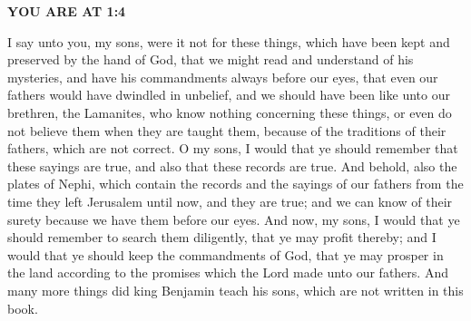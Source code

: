
\textbf{YOU ARE AT 1:4}

\bchapter

\bverse \iffalse I say unto you, my sons, were it not for these things, which have been kept and preserved by the hand of God, that we might read and understand of his mysteries, and have his commandments always before our eyes, that even our fathers would have dwindled in unbelief, and we should have been like unto our brethren, the Lamanites, who know nothing concerning these things, or even do not believe them when they are taught them, because of the traditions of their fathers, which are not correct. \fi
I say unto you, my sons, were it not for these things, which have been kept and preserved by the hand of God, that we might read and understand of his mysteries, and have his commandments always before our eyes, that even our fathers would have dwindled in unbelief, and we should have been like unto our brethren, the Lamanites, who know nothing concerning these things, or even do not believe them when they are taught them, because of the traditions of their fathers, which are not correct.
\bverse \iffalse O my sons, I would that ye should remember that these sayings are true, and also that these records are true. And behold, also the plates of Nephi, which contain the records and the sayings of our fathers from the time they left Jerusalem until now, and they are true; and we can know of their surety because we have them before our eyes. \fi
O my sons, I would that ye should remember that these sayings are true, and also that these records are true. And behold, also the plates of Nephi, which contain the records and the sayings of our fathers from the time they left Jerusalem until now, and they are true; and we can know of their surety because we have them before our eyes.
\bverse \iffalse And now, my sons, I would that ye should remember to search them diligently, that ye may profit thereby; and I would that ye should keep the commandments of God, that ye may prosper in the land according to the promises which the Lord made unto our fathers. \fi
And now, my sons, I would that ye should remember to search them diligently, that ye may profit thereby; and I would that ye should keep the commandments of God, that ye may prosper in the land according to the promises which the Lord made unto our fathers.
\bverse \iffalse And many more things did king Benjamin teach his sons, which are not written in this book. \fi
And many more things did king Benjamin teach his sons, which are not written in this book.
